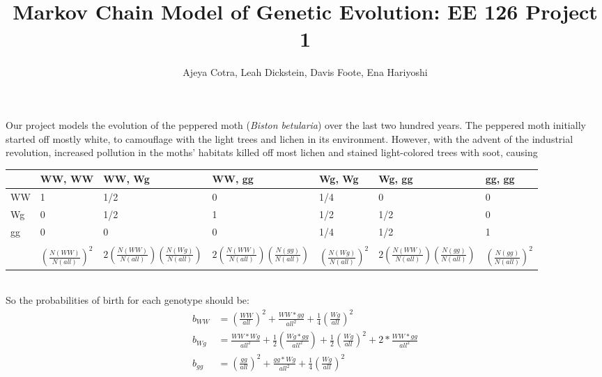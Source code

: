\documentclass[leqno]{article}
\begin{document}
\title{Markov Chain Model of Genetic Evolution: EE 126 Project 1}
\author{Ajeya Cotra, Leah Dickstein, Davis Foote, Ena Hariyoshi}

\maketitle




Our project models the evolution of the peppered moth ({\it Biston betularia}) over the last two hundred years. The peppered moth initially started off mostly white, to camouflage with the light trees and lichen in its environment. However, with the advent of the industrial revolution, increased pollution in the moths' habitats killed off most lichen and stained light-colored trees with soot, causing 

\begin{tabular}{l|l|l|l|l|l|l}
{} & WW, WW & WW, Wg & WW, gg & Wg, Wg & Wg, gg & gg, gg\\
\hline
WW & 1 & 1/2 & 0 & 1/4 & 0 & 0\\
Wg & 0 & 1/2 & 1 & 1/2 & 1/2 & 0\\
gg & 0 & 0 & 0 & 1/4 & 1/2 & 1\\
\hline\\
{} & $(\frac{N(WW)}{N(all)})^2$ & $2(\frac{N(WW)}{N(all)})(\frac{N(Wg)}{N(all)})$ & $2(\frac{N(WW)}{N(all)})(\frac{N(gg)}{N(all)})$ & $(\frac{N(Wg)}{N(all)})^2$ & $2(\frac{N(WW)}{N(all)})(\frac{N(gg)}{N(all)})$ & $(\frac{N(gg)}{N(all)})^2$
\end{tabular}\\

So the probabilities of birth for each genotype should be:
\begin{align*}
b_{WW} &= \left(\frac{WW}{all} \right)^2 + \frac{WW*gg}{all^2} + \frac{1}{4}\left(\frac{Wg}{all}\right)^2\\
b_{Wg} &= \frac{WW*Wg}{all^2} + \frac{1}{2}\left(\frac{Wg*gg}{all^2}\right) + \frac{1}{2}\left(\frac{Wg}{all}\right)^2 + 2*\frac{WW*gg}{all^2}\\
b_{gg} &= \left(\frac{gg}{all}\right)^2 + \frac{gg*Wg}{all^2} + \frac{1}{4} \left(\frac{Wg}{all}\right)^2
\end{align*}
\end{document}
